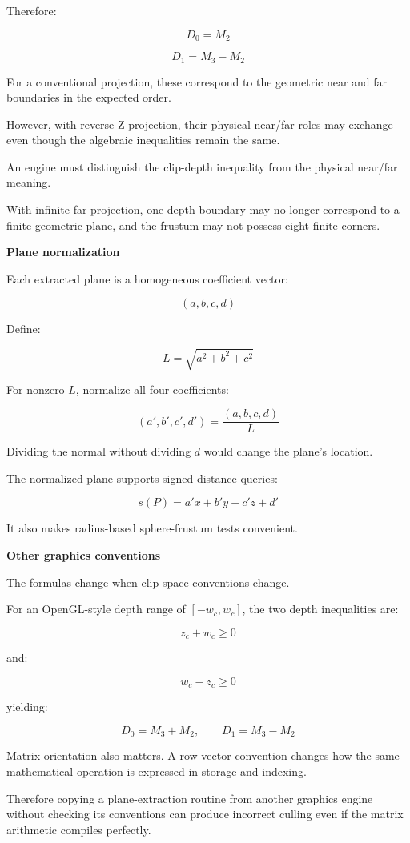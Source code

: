 Therefore:

\[
\boxed{D_0=M_2}
\]

\[
\boxed{D_1=M_3-M_2}
\]

For a conventional projection, these correspond to the geometric near and far boundaries in the expected order.

However, with reverse-Z projection, their physical near/far roles may exchange even though the algebraic inequalities remain the same.

An engine must distinguish the clip-depth inequality from the physical near/far meaning.

With infinite-far projection, one depth boundary may no longer correspond to a finite geometric plane, and the frustum may not possess eight finite corners.

\textbf{Plane normalization}

Each extracted plane is a homogeneous coefficient vector:

\[
(a,b,c,d)
\]

Define:

\[
L=\sqrt{a^2+b^2+c^2}
\]

For nonzero \(L\), normalize all four coefficients:

\[
(a',b',c',d')= \frac{(a,b,c,d)}{L}
\]

Dividing the normal without dividing \(d\) would change the plane's location.

The normalized plane supports signed-distance queries:

\[
s(P)=a'x+b'y+c'z+d'
\]

It also makes radius-based sphere-frustum tests convenient.

\textbf{Other graphics conventions}

The formulas change when clip-space conventions change.

For an OpenGL-style depth range of \([-w_c,w_c]\), the two depth inequalities are:

\[
z_c+w_c\ge0
\]

and:

\[
w_c-z_c\ge0
\]

yielding:

\[
D_0=M_3+M_2,\qquad D_1=M_3-M_2
\]

Matrix orientation also matters. A row-vector convention changes how the same mathematical operation is expressed in storage and indexing.

Therefore copying a plane-extraction routine from another graphics engine without checking its conventions can produce incorrect culling even if the matrix arithmetic compiles perfectly.

